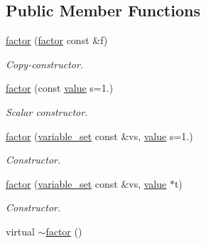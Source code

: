 \subsection*{Public Member Functions}
\begin{DoxyCompactItemize}
\item 
\hyperlink{classmerlin_1_1factor_ad60ed4da09302aac8c5163bb0040e26d}{factor} (\hyperlink{classmerlin_1_1factor}{factor} const \&f)
\begin{DoxyCompactList}\small\item\em Copy-\/constructor. \end{DoxyCompactList}\item 
\hyperlink{classmerlin_1_1factor_ae5c45e239cbedf66b237f5b77b3887cb}{factor} (const \hyperlink{classmerlin_1_1factor_a1b14d19e509403448fbef26b003c9281}{value} s=1.)
\begin{DoxyCompactList}\small\item\em Scalar constructor. \end{DoxyCompactList}\item 
\hyperlink{classmerlin_1_1factor_ad51a55b844059e2cba12af733e31904a}{factor} (\hyperlink{classmerlin_1_1variable__set}{variable\+\_\+set} const \&vs, \hyperlink{classmerlin_1_1factor_a1b14d19e509403448fbef26b003c9281}{value} s=1.)
\begin{DoxyCompactList}\small\item\em Constructor. \end{DoxyCompactList}\item 
\hyperlink{classmerlin_1_1factor_aedf339b91386fbffd3821890338f6cb8}{factor} (\hyperlink{classmerlin_1_1variable__set}{variable\+\_\+set} const \&vs, \hyperlink{classmerlin_1_1factor_a1b14d19e509403448fbef26b003c9281}{value} $\ast$t)
\begin{DoxyCompactList}\small\item\em Constructor. \end{DoxyCompactList}\item 
virtual \hyperlink{classmerlin_1_1factor_aaa50fa2be90bd54297728d19d8ff7dea}{$\sim$factor} ()\hypertarget{classmerlin_1_1factor_aaa50fa2be90bd54297728d19d8ff7dea}{}\label{classmerlin_1_1factor_aaa50fa2be90bd54297728d19d8ff7dea}


\end{DoxyCompactItemize}
